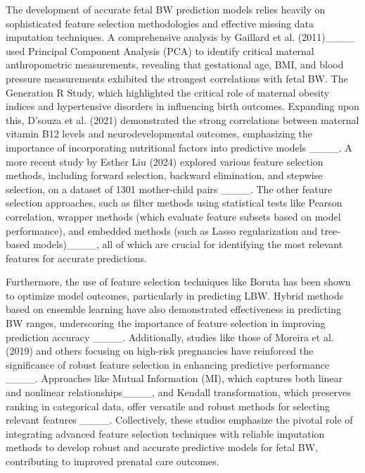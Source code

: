 The development of accurate fetal BW prediction models relies heavily on sophisticated feature selection methodologies and effective missing data imputation techniques. A comprehensive analysis by Gaillard et al. (2011)____ used Principal Component Analysis (PCA) to identify critical maternal anthropometric measurements, revealing that gestational age, BMI, and blood pressure measurements exhibited the strongest correlations with fetal BW. The Generation R Study, which highlighted the critical role of maternal obesity indices and hypertensive disorders in influencing birth outcomes. Expanding upon this, D'souza et al. (2021) demonstrated the strong correlations between maternal vitamin B12 levels and neurodevelopmental outcomes, emphasizing the importance of incorporating nutritional factors into predictive models ____. A more recent study by Esther Liu (2024) explored various feature selection methods, including forward selection, backward elimination, and stepwise selection, on a dataset of 1301 mother-child pairs ____. The other feature selection approaches, such as filter methods using statistical tests like Pearson correlation, wrapper methods (which evaluate feature subsets based on model performance), and embedded methods (such as Lasso regularization and tree-based models)____, all of which are crucial for identifying the most relevant features for accurate predictions. 

Furthermore, the use of feature selection techniques like Boruta has been shown to optimize model outcomes, particularly in predicting LBW. Hybrid methods based on ensemble learning have also demonstrated effectiveness in predicting BW ranges, underscoring the importance of feature selection in improving prediction accuracy ____. Additionally, studies like those of Moreira et al. (2019) and others focusing on high-risk pregnancies have reinforced the significance of robust feature selection in enhancing predictive performance ____. Approaches like Mutual Information (MI), which captures both linear and nonlinear relationships____, and Kendall transformation, which preserves ranking in categorical data, offer versatile and robust methods for selecting relevant features ____. Collectively, these studies emphasize the pivotal role of integrating advanced feature selection techniques with reliable imputation methods to develop robust and accurate predictive models for fetal BW, contributing to improved prenatal care outcomes.

